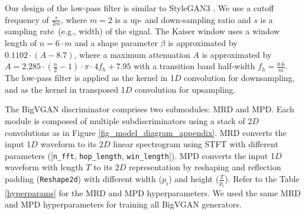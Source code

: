 \documentclass{article} \usepackage{iclr2023_conference,times}
\theoremstyle{plain}
\theoremstyle{definition}
\theoremstyle{remark}
\begin{document}
Our design of the low-pass filter is similar to StyleGAN3 \citep{karras2021alias}. We use a cutoff frequency of $\frac{s}{2m}$, where $m=2$ is a up- and down-sampling ratio and $s$ is a sampling rate~(e.g., width) of the signal. The Kaiser window uses a window length of $n=6 \cdot m$ and a shape parameter $\beta$ is approximated by $0.1102 \cdot (A-8.7)$, where a maximum attenuation $A$ is approximated by $A=2.285 \cdot (\frac{n}{2} -1) \cdot \pi \cdot 4f_h + 7.95$ \citep{dsp} with a transition band half-width $f_h=\frac{0.6}{m}$. The low-pass filter is applied as the kernel in 1$D$ convolution for downsampling, and as the kernel in transposed 1$D$ convolution for upsampling.


The BigVGAN discriminator comprises two submodules: MRD and MPD. Each module is composed of multiple subdiscriminators using a stack of 2$D$ convolutions as in Figure \ref{fig_model_diagram_appendix}. MRD converts the input 1$D$ waveform to its 2$D$ linear spectrogram using STFT with different parameters ([\texttt{n\_fft}, \texttt{hop\_length}, \texttt{win\_length}]). MPD converts the input 1$D$ waveform with length $T$ to its 2$D$ representation by reshaping and reflection padding (\texttt{Reshape2d}) with different width ($p_i$) and height ($\frac{T}{p_i}$). Refer to the Table \ref{hyperparams} for the MRD and MPD hyperparameters. We used the same MRD and MPD hyperparameters for training all BigVGAN generators.
\end{document}
